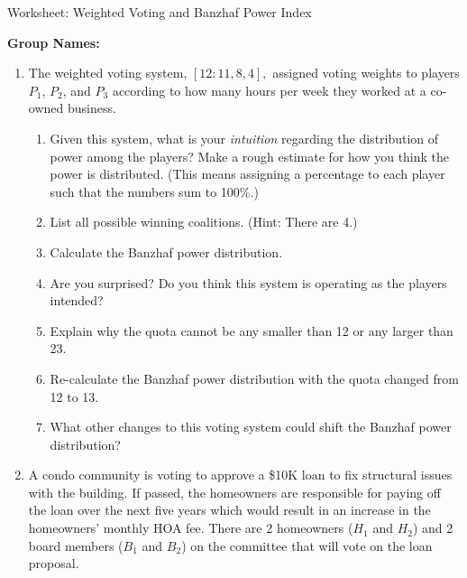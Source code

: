 \documentclass[12pt]{article}
\begin{document}
\begin{center}
{\Large  Worksheet:  Weighted Voting and Banzhaf Power Index 	}
\end{center}



\noindent \textbf{Group Names:} \hrulefill \\
\begin{enumerate}
\item The weighted voting system, $[12:11,8,4],$ assigned voting weights to players $P_1$, $P_2$, and $P_3$ according to how many hours per week they worked at a co-owned business.
	\begin{enumerate}
	\item Given this system, what is your \emph{intuition} regarding the distribution of power among the players? Make a rough estimate for how you think the power is distributed. (This means assigning a percentage to each player such that the numbers sum to 100\%.)
	\vfill
	\item List all possible winning coalitions. (Hint: There are 4.)
	\vfill
	
	\vfill
	
	\item Calculate the Banzhaf power distribution. 
	\vfill
	
	\vfill
	\item Are you surprised? Do you think this system is operating as the players intended?
	\vfill
	\item Explain why the quota cannot be any smaller than 12 or any larger than 23.
	\vfill
	\item Re-calculate the Banzhaf power distribution with the quota changed from 12 to 13.
	\vfill
	
	\vfill
	\item What other changes to this voting system could shift the Banzhaf power distribution?
	\vfill
	\end{enumerate}
	
\newpage




  \item A condo community is voting to approve a \$10K loan to fix 
    structural issues with the building. If passed, the
    homeowners are responsible for paying off the loan over the next five
    years which would result in an increase in the homeowners' monthly HOA
    fee. There are 2 homeowners ($H_1$ and $H_2$) and 2 board members ($B_1$ and $B_2$) on the committee that will vote on the loan proposal.
    

\end{enumerate}
\end{document}
